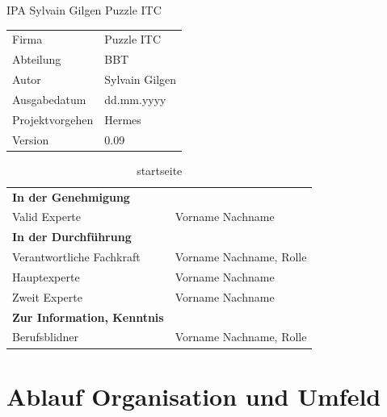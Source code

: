\documentclass{report}
\author{Sylvain}
\begin{document}
\begin{titlepage}
  \Huge IPA Sylvain Gilgen Puzzle ITC\normalsize
\bigbreak
\begin{table}[h!]
    \begin{tabular}{|R{0.2\textwidth}|L{0.7\textwidth}|}
        \hline
          \\[12pt]
        \hline
        Firma & Puzzle ITC \\
        \hline
        Abteilung & BBT \\
        \hline
        Autor & Sylvain Gilgen \\
        \hline
        Ausgabedatum & dd.mm.yyyy \\
        \hline
        Projektvorgehen & Hermes \\
        \hline
        Version & 0.09 \\
        \hline
      \end{tabular}
\end{table}
\begin{table}[!h]
    \caption{startseite}
    \begin{tabular}{|L{0.4\textwidth}|L{0.5\textwidth}|}
        \hline
          \\[12pt]
        \hline
        \textbf{In der Genehmigung} & \\
        \hline
        Valid Experte & Vorname Nachname \\
        \hline
        \textbf{In der Durchführung} & \\
        \hline
        Verantwortliche Fachkraft & Vorname Nachname, Rolle \\
        \hline
        Hauptexperte & Vorname Nachname \\
        \hline
        Zweit Experte & Vorname Nachname \\
        \hline
        \textbf{Zur Information, Kenntnis} & \\
        \hline
        Berufsblidner & Vorname Nachname, Rolle \\
        \hline
    \end{tabular}
\end{table}
\end{titlepage}

\part{Ablauf Organisation und Umfeld}
\end{document}
